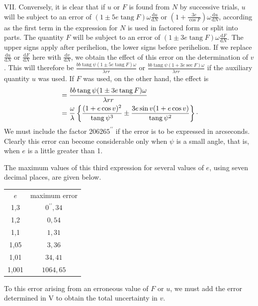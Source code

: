 VII. Conversely, it is clear that if $u$ or $F$ is found from $N$ by successive trials, $u$ will be subject to an error of $(1\pm5e\operatorname{tang}F)\omega\frac{\mathrm{d}u}{\mathrm{d}N}$ or $\left(1+\frac{3e}{\cos F}\right)\omega\frac{\mathrm{d}u}{\mathrm{d}N}$, according as the first term in the expression for $N$ is used in factored form or split into parts. The quantity $F$ will be subject to an error of $(1\pm3e\operatorname{tang}F)\omega\frac{\mathrm{d}F}{\mathrm{d}N}$. The upper signs apply after perihelion, the lower signs before perihelion. If we replace $\frac{\mathrm{d}u}{\mathrm{d}N}$ or $\frac{\mathrm{d}F}{\mathrm{d}N}$ here with $\frac{\mathrm{d}v}{\mathrm{d}N}$, we obtain the effect of this error on the determination of $v$. This will therefore be $\frac{bb\operatorname{tang}\psi(1\pm5e\operatorname{tang}F)\omega}{\lambda rr}$ or $\frac{bb\operatorname{tang}\psi(1+3e\operatorname{sec} F)\omega}{\lambda rr}$ if the auxiliary quantity $u$ was used. If $F$ was used, on the other hand, the effect is
\[
\begin{aligned}
&=\frac{bb\operatorname{tang}\psi(1\pm3e\operatorname{tang}F)\omega}{\lambda rr}\\
&=\frac{\omega}{\lambda}\left\{\frac{(1+e\cos v)^2}{\operatorname{tang}\psi^3}\pm\frac{3e\sin v(1+e\cos v)}{\operatorname{tang}\psi^2}\right\}\raisebox{.45ex}{.}
\end{aligned}
\]
We must include the factor $206265^{\prime\prime}$ if the error is to be expressed in arcseconds. Clearly this error can become considerable only when $\psi$ is a small angle, that is, when $e$ is a little greater than 1.

The maximum values of this third expression for several values of $e$, using seven decimal places, are given below.

\begin{center}
\begin{tabular}{c|c}
$e$ & maximum error \\
1,3 & $0^{\prime\prime}{,}34$ \\
1,2 & $0{,}54$ \\
1,1 & $1{,}31$ \\
1,05 & $3{,}36$ \\
1,01 & $34{,}41$ \\
1,001 & $1064{,}65$ \\
\end{tabular}
\end{center}
\noindent To this error arising from an erroneous value of $F$ or $u$, we must add the error determined in V to obtain the total uncertainty in $v$.

